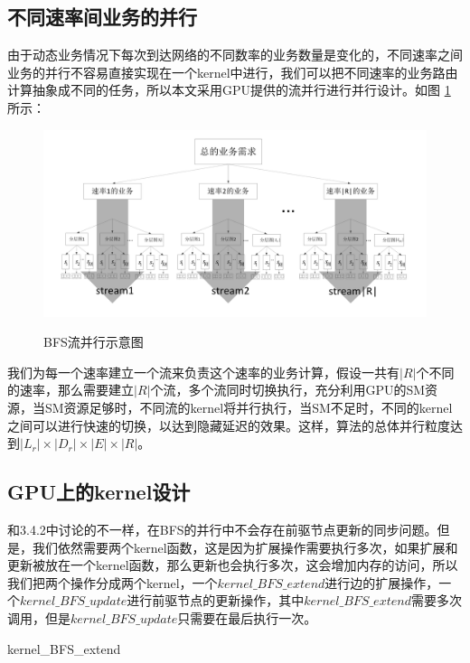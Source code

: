 \subsection{不同速率间业务的并行}
由于动态业务情况下每次到达网络的不同数率的业务数量是变化的，不同速率之间业务的并行不容易直接实现在一个kernel中进行，我们可以把不同速率的业务路由计算抽象成不同的任务，所以本文采用GPU提供的流并行进行并行设计。如图 \ref{bfssteam}所示：
\begin{figure}
\setlength{\belowcaptionskip}{-0.5cm}
\begin{center}
{\includegraphics[width=1 \textwidth]{figures/hbfs.pdf}}
\end{center}
\caption{{\footnotesize{BFS流并行示意图}}}
\label{bfssteam}
\end{figure}

我们为每一个速率建立一个流来负责这个速率的业务计算，假设一共有$|R|$个不同的速率，那么需要建立$|R|$个流，多个流同时切换执行，充分利用GPU的SM资源，当SM资源足够时，不同流的kernel将并行执行，当SM不足时，不同的kernel之间可以进行快速的切换，以达到隐藏延迟的效果。这样，算法的总体并行粒度达到$|L_r|\times|D_r|\times|E|\times|R|$。

\subsection{GPU上的kernel设计}
和3.4.2中讨论的不一样，在BFS的并行中不会存在前驱节点更新的同步问题。但是，我们依然需要两个kernel函数，这是因为扩展操作需要执行多次，如果扩展和更新被放在一个kernel函数，那么更新也会执行多次，这会增加内存的访问，所以我们把两个操作分成两个kernel，一个$kernel\_BFS\_extend$进行边的扩展操作，一个$kernel\_BFS\_update$进行前驱节点的更新操作，其中$kernel\_BFS\_extend$需要多次调用，但是$kernel\_BFS\_update$只需要在最后执行一次。
\begin{algorithm}[t]
\begin{algorithmic}[1]
\EndIf
{}
\EndIf
\EndFunction
\end{algorithmic}
\caption{kernel\_BFS\_extend}
\label{KernelBFS}
\end{algorithm}

